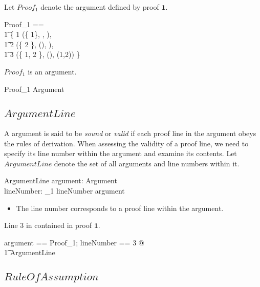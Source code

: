 \documentclass[11pt, oneside]{article}
\begin{document}
Let $Proof_1$ denote the argument defined by proof $\mathbf{1}$.

\begin{zed}
	Proof_1 == \\
	\t1	\{ 1 \mapsto (\{ 1\}, \propP \impliesPropVV \propQ, ), \\
	\t1	2 \mapsto (\{ 2 \}, \varProp(\propP), ), \\
	\t1	3 \mapsto (\{ 1, 2 \}, \varProp(\propQ), (1,2)) \}
\end{zed}

\begin{example}
$Proof_1$ is an argument.

\begin{zed}
	Proof_1 \in Argument
\end{zed}

\end{example}

\subsection{$ArgumentLine$}

A argument is said to be {\it sound} or {\it valid} if each proof line in the argument
obeys the rules of derivation.
When assessing the validity of a proof line, we need to specify its line number within
the argument and examine its contents.
Let $ArgumentLine$ denote the set of all arguments and line numbers within it.

\begin{schema}{ArgumentLine}
	argument: Argument \\
	lineNumber: \nat_1
\where
	lineNumber \in \dom argument
\end{schema}

\begin{itemize}
\item The line number corresponds to a proof line within the argument.
\end{itemize}

\begin{example}
Line 3 in contained in proof $\mathbf{1}$.

\begin{zed}
	\LET argument == Proof_1; lineNumber == 3 @ \\
	\t1	ArgumentLine
\end{zed}

\end{example}

\subsection{$RuleOfAssumption$}
\end{document}
